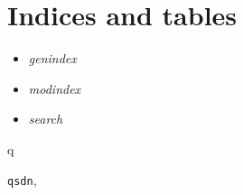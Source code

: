 \documentclass[letterpaper,10pt,english]{sphinxmanual}
\begin{document}
\chapter{Indices and tables}
\label{index:welcome-to-standard-decimal-notation-s-documentation}\label{index:indices-and-tables}\begin{itemize}
\item {} 
\emph{genindex}

\item {} 
\emph{modindex}

\item {} 
\emph{search}

\end{itemize}


\renewcommand{\indexname}{Python Module Index}
\begin{theindex}
\def\bigletter#1{{\Large\sffamily#1}\nopagebreak\vspace{1mm}}
\bigletter{q}
\item {\texttt{qsdn}}, \pageref{index:module-qsdn}
\end{theindex}

\renewcommand{\indexname}{Index}
\printindex
\end{document}
